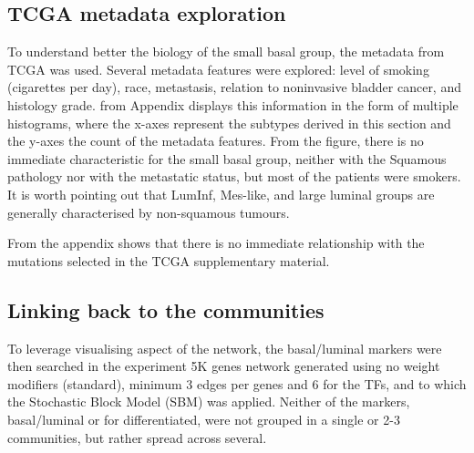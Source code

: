 \subsection{TCGA metadata exploration} \label{s:N_I:sel_tfs_metadata}

To understand better the biology of the small basal group, the metadata from TCGA \citep{Cancer_Genome_Atlas_Research_Network2014-xp} was used. Several metadata features were explored: level of smoking (cigarettes per day), race, metastasis, relation to noninvasive bladder cancer, and histology grade.  from Appendix displays this information in the form of multiple histograms, where the x-axes represent the subtypes derived in this section and the y-axes the count of the metadata features. From the figure, there is no immediate characteristic for the small basal group, neither with the Squamous pathology nor with the metastatic status, but most of the patients were smokers. It is worth pointing out that LumInf, Mes-like, and large luminal groups are generally characterised by non-squamous tumours. 

From the appendix  shows that there is no immediate relationship with the mutations selected in the TCGA supplementary material.


\subsection{Linking back to the communities} \label{s:N_I:sel_tfs_net}

To leverage visualising aspect of the network, the basal/luminal markers were then searched in the experiment 5K genes network generated using no weight modifiers (standard), minimum 3 edges per genes and 6 for the TFs, and to which the Stochastic Block Model (SBM) was applied. Neither of the markers, basal/luminal or for differentiated, were not grouped in a single or 2-3 communities, but rather spread across several.


